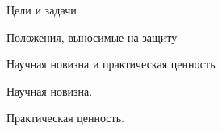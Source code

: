 \begin{frame}{Цели и задачи}
  
\end{frame}

\begin{frame}{Положения, выносимые на защиту}
  
\end{frame}

\begin{frame}{Научная новизна и практическая ценность}
  \begin{block}{Научная новизна.}
    
  \end{block}

  \begin{block}{Практическая ценность.}
   
  \end{block}
\end{frame}